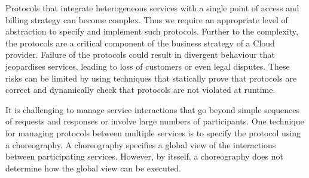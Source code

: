 \documentclass[10pt]{llncs}
\begin{document}
Protocols that integrate heterogeneous services with a single point of access and billing strategy can become complex. Thus we require an appropriate level of abstraction to specify and implement such protocols. Further to the complexity, the protocols are a critical component of the business strategy of a Cloud provider. Failure of the protocols could result in divergent behaviour that jeopardises services, leading to loss of customers or even legal disputes. These risks can be limited by using techniques that statically prove that protocols are correct and dynamically check that protocols are not violated at runtime.

It is challenging to manage service interactions that go beyond simple sequences of requests and responses or involve large numbers of participants. %
One technique for managing protocols between multiple services is to specify the protocol using a choreography.
A choreography specifies a global view of the interactions between participating services. %
However, by itsself, a choreography does not determine how the global view can be executed.

\end{document}
